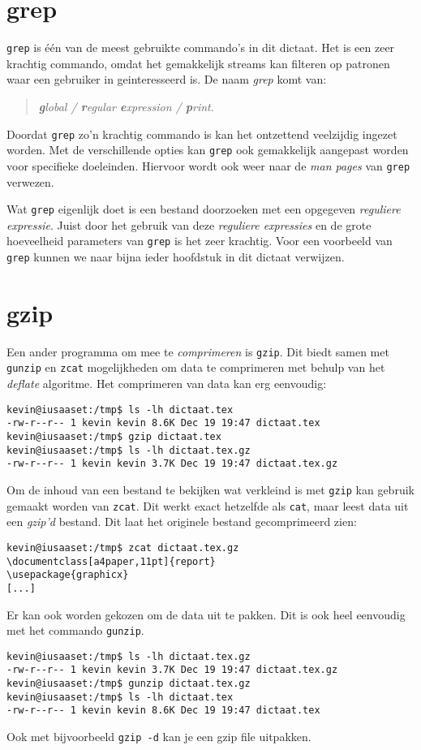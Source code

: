 \section{grep}
\texttt{grep} is \'{e}\'{e}n van de meest gebruikte commando's in dit dictaat. Het is een zeer krachtig commando, omdat het gemakkelijk streams kan filteren op patronen waar een gebruiker in geinteresseerd is. De naam \emph{grep} komt van: 
\begin{quote}
\emph{\textbf{g}lobal / \textbf{r}egular \textbf{e}xpression / \textbf{p}rint}. 
\end{quote}\cite{bib.grep}
Doordat \texttt{grep} zo'n krachtig commando is kan het ontzettend veelzijdig ingezet worden. Met de verschillende opties kan \texttt{grep} ook gemakkelijk aangepast worden voor specifieke doeleinden. Hiervoor wordt ook weer naar de \emph{man pages} van \texttt{grep} verwezen.

Wat \texttt{grep} eigenlijk doet is een bestand doorzoeken met een opgegeven \emph{reguliere expressie}. Juist door het gebruik van deze \emph{reguliere expressies} en de grote hoeveelheid parameters van \texttt{grep} is het zeer krachtig. Voor een voorbeeld van \texttt{grep} kunnen we naar bijna ieder hoofdstuk in dit dictaat verwijzen.

\section{gzip}
Een ander programma om mee te \emph{comprimeren} is \texttt{gzip}. Dit biedt samen met \texttt{gunzip} en \texttt{zcat} mogelijkheden om data te comprimeren met behulp van het \emph{deflate}\cite{bib.deflate} algoritme. Het comprimeren van data kan erg eenvoudig:
\begin{lstlisting}
kevin@iusaaset:/tmp$ ls -lh dictaat.tex 
-rw-r--r-- 1 kevin kevin 8.6K Dec 19 19:47 dictaat.tex
kevin@iusaaset:/tmp$ gzip dictaat.tex 
kevin@iusaaset:/tmp$ ls -lh dictaat.tex.gz 
-rw-r--r-- 1 kevin kevin 3.7K Dec 19 19:47 dictaat.tex.gz
\end{lstlisting}%
Om de inhoud van een bestand te bekijken wat verkleind is met \texttt{gzip} kan gebruik gemaakt worden van \texttt{zcat}. Dit werkt exact hetzelfde als \texttt{cat}, maar leest data uit een \emph{gzip'd} bestand. Dit laat het originele bestand gecomprimeerd zien:
\begin{lstlisting}
kevin@iusaaset:/tmp$ zcat dictaat.tex.gz
\documentclass[a4paper,11pt]{report}
\usepackage{graphicx}
[...]
\end{lstlisting}%
Er kan ook worden gekozen om de data uit te pakken. Dit is ook heel eenvoudig met het commando \texttt{gunzip}. 
\begin{lstlisting}
kevin@iusaaset:/tmp$ ls -lh dictaat.tex.gz 
-rw-r--r-- 1 kevin kevin 3.7K Dec 19 19:47 dictaat.tex.gz
kevin@iusaaset:/tmp$ gunzip dictaat.tex.gz 
kevin@iusaaset:/tmp$ ls -lh dictaat.tex 
-rw-r--r-- 1 kevin kevin 8.6K Dec 19 19:47 dictaat.tex
\end{lstlisting}%
Ook met bijvoorbeeld \texttt{gzip -d} kan je een gzip file uitpakken.
 
